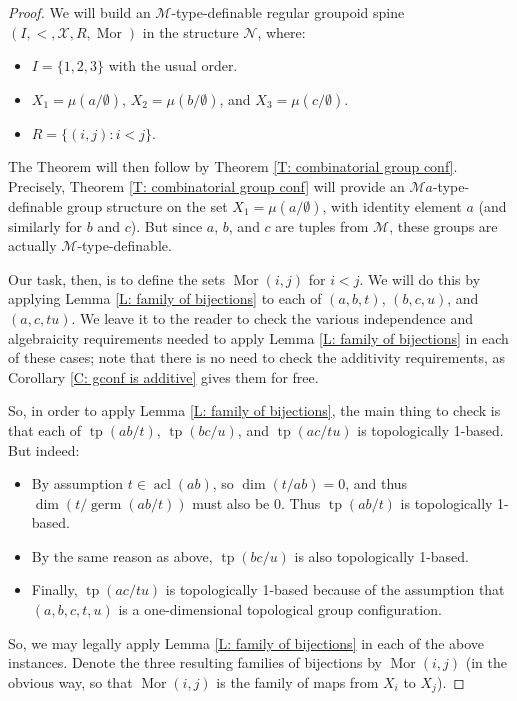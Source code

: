 \documentclass[10pt,a4paper]{amsart}
\newcommand{\acl}{\operatorname{acl}}
\newcommand{\tp}{\operatorname{tp}}
\begin{document}
    \begin{proof}
        We will build an $\mathcal M$-type-definable regular groupoid spine $(I,<,\mathcal X,R,\operatorname{Mor})$ in the structure $\mathcal N$, where:
        \begin{itemize}
            \item $I=\{1,2,3\}$ with the usual order.
            \item $X_1=\mu(a/\emptyset)$, $X_2=\mu(b/\emptyset)$, and $X_3=\mu(c/\emptyset)$.
            \item $R=\{(i,j):i<j\}$.
        \end{itemize}
        The Theorem will then follow by Theorem \ref{T: combinatorial group conf}. Precisely, Theorem \ref{T: combinatorial group conf} will provide an $\mathcal Ma$-type-definable group structure on the set $X_1=\mu(a/\emptyset)$, with identity element $a$ (and similarly for $b$ and $c$). But since $a$, $b$, and $c$ are tuples from $\mathcal M$, these groups are actually $\mathcal M$-type-definable. 

        Our task, then, is to define the sets $\operatorname{Mor}(i,j)$ for $i<j$. We will do this by applying Lemma \ref{L: family of bijections} to each of $(a,b,t)$, $(b,c,u)$, and $(a,c,tu)$. We leave it to the reader to check the various independence and algebraicity requirements needed to apply Lemma \ref{L: family of bijections} in each of these cases; note that there is no need to check the additivity requirements, as Corollary \ref{C: gconf is additive}  gives them for free.

        So, in order to apply Lemma \ref{L: family of bijections}, the main thing to check is that each of $\tp(ab/t)$, $\tp(bc/u)$, and $\tp(ac/tu)$ is topologically 1-based. But indeed:
        
        \begin{itemize}
            \item By assumption $t\in\acl(ab)$, so $\dim(t/ab)=0$, and thus $\dim(t/\operatorname{germ}(ab/t))$ must also be 0. Thus $\tp(ab/t)$ is topologically 1-based.
            \item By the same reason as above, $\tp(bc/u)$ is also topologically 1-based.
            \item Finally, $\tp(ac/tu)$ is topologically 1-based because of the assumption that $(a,b,c,t,u)$ is a one-dimensional topological group configuration.
        \end{itemize}
        
        So, we may legally apply Lemma \ref{L: family of bijections} in each of the above instances. Denote the three resulting families of bijections by $\operatorname{Mor}(i,j)$ (in the obvious way, so that $\operatorname{Mor}(i,j)$ is the family of maps from $X_i$ to $X_j$).
        

\end{proof}
\end{document}

